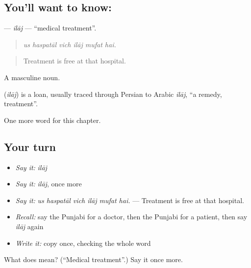 \subsection*{You'll want to know: }
\textbf{} — \emph{ilāj} — \textquotedblleft{}medical treatment\textquotedblright{}.

\begin{quote}
     
\end{quote}

\begin{quote}
\emph{us haspatāl vich ilāj mufat hai.}
\end{quote}

\begin{quote}
Treatment is free at that hospital.
\end{quote}

A masculine noun.

\begin{cousinweb}
\textbf{} (\emph{ilāj}) is a loan, usually traced through Persian to Arabic \emph{ilāj}, \textquotedblleft{}a remedy, treatment\textquotedblright{}.
\end{cousinweb}

\begin{grammarlens}[title={What you've built}]
One more word for this chapter.
\end{grammarlens}

\subsection*{Your turn}
\begin{itemize}
\raggedright
  \item \emph{Say it:} \emph{ilāj}
  \item \emph{Say it:} \emph{ilāj}, once more
  \item \emph{Say it:} \emph{us haspatāl vich ilāj mufat hai.} — Treatment is free at that hospital.
  \item \emph{Recall:} say the Punjabi for a doctor, then the Punjabi for a patient, then say \emph{ilāj} again
  \item \emph{Write it:} copy \textbf{} once, checking the whole word
\end{itemize}

\begin{tcolorbox}[breakable,colback=teal!4,colframe=teal!35!black,title={Before you move on}]
What does  mean? (\textquotedblleft{}Medical treatment\textquotedblright{}.) Say it once more.
\end{tcolorbox}
